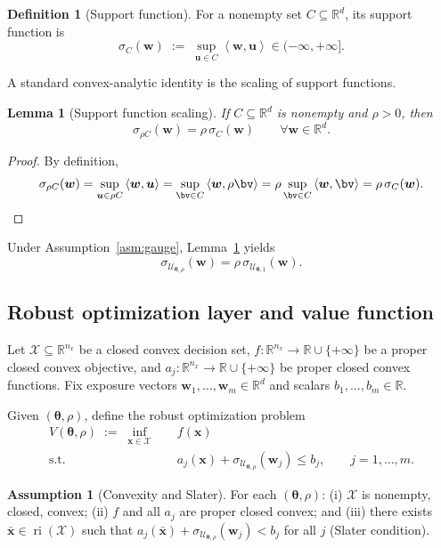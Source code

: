 \documentclass[11pt]{article}
\newcommand{\R}{\mathbb{R}}
\newcommand{\cX}{\mathcal{X}}
\newcommand{\cU}{\mathcal{U}}
\newcommand{\ip}[2]{\left\langle #1, #2 \right\rangle}
\newcommand{\btheta}{\bm{\theta}}
\newcommand{\bu}{\bm{u}}
\newcommand{\bw}{\bm{w}}
\newcommand{\bx}{\bm{x}}
\DeclareMathOperator{\ri}{ri}
\theoremstyle{plain}
\newtheorem{lemma}[theorem]{Lemma}
\theoremstyle{definition}
\newtheorem{definition}[theorem]{Definition}
\newtheorem{assumption}[theorem]{Assumption}
\begin{document}
\begin{definition}[Support function]
For a nonempty set $C\subseteq \R^d$, its support function is
\[
\sigma_C(\bw) \;:=\; \sup_{\bu\in C}\ip{\bw}{\bu} \in (-\infty,+\infty].
\]
\end{definition}

A standard convex-analytic identity is the scaling of support functions.

\begin{lemma}[Support function scaling]\label{lem:support-scaling}
If $C\subseteq \R^d$ is nonempty and $\rho>0$, then
\[
\sigma_{\rho C}(\bw) = \rho\,\sigma_C(\bw)\qquad \forall \bw\in \R^d.
\]
\end{lemma}

\begin{proof}
By definition,
\[
\sigma_{\rho C}(\bw)
=\sup_{\bu\in \rho C}\ip{\bw}{\bu}
=\sup_{\bv\in C}\ip{\bw}{\rho \bv}
=\rho \sup_{\bv\in C}\ip{\bw}{\bv}
=\rho\,\sigma_C(\bw).
\]
\end{proof}

Under Assumption~\ref{asm:gauge}, Lemma~\ref{lem:support-scaling} yields
\begin{equation}\label{eq:sigma-scale}
\sigma_{\cU_{\btheta,\rho}}(\bw) = \rho\,\sigma_{\cU_{\btheta,1}}(\bw).
\end{equation}

\subsection{Robust optimization layer and value function}

Let $\cX\subseteq \R^{n_x}$ be a closed convex decision set, $f:\R^{n_x}\to \R\cup\{+\infty\}$ be a proper closed convex objective,
and $a_j:\R^{n_x}\to \R\cup\{+\infty\}$ be proper closed convex functions.
Fix exposure vectors $\bw_1,\dots,\bw_m\in \R^d$ and scalars $b_1,\dots,b_m\in \R$.

Given $(\btheta,\rho)$, define the robust optimization problem
\begin{equation}\label{eq:robust}
\begin{aligned}
V(\btheta,\rho)
\;:=\;
\inf_{\bx\in \cX}\quad & f(\bx)\\
\text{s.t.}\quad &
a_j(\bx)+\sigma_{\cU_{\btheta,\rho}}(\bw_j)\le b_j,\qquad j=1,\dots,m.
\end{aligned}
\end{equation}

\begin{assumption}[Convexity and Slater]\label{asm:slater}
For each $(\btheta,\rho)$:
(i) $\cX$ is nonempty, closed, convex; (ii) $f$ and all $a_j$ are proper closed convex; and
(iii) there exists $\bar{\bx}\in \ri(\cX)$ such that
$a_j(\bar{\bx})+\sigma_{\cU_{\btheta,\rho}}(\bw_j) < b_j$ for all $j$ (Slater condition).
\end{assumption}
\end{document}
